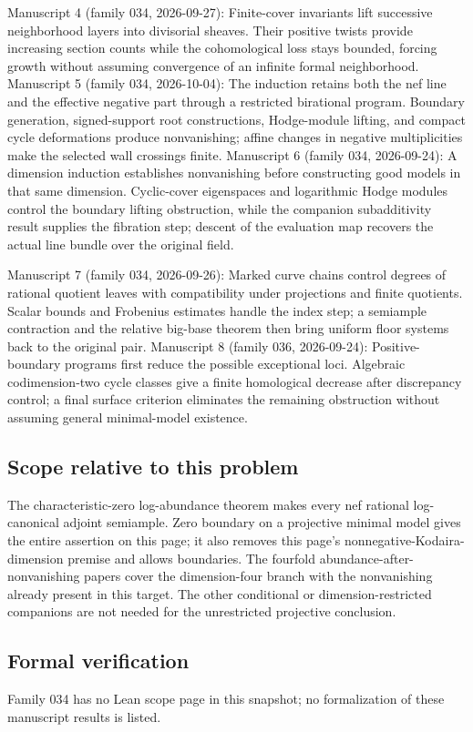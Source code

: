 \documentclass[11pt]{article}
\begin{document}
Manuscript 4 (family 034, 2026-09-27): Finite-cover invariants lift successive neighborhood layers into divisorial sheaves. Their positive twists provide increasing section counts while the cohomological loss stays bounded, forcing growth without assuming convergence of an infinite formal neighborhood. Manuscript 5 (family 034, 2026-10-04): The induction retains both the nef line and the effective negative part through a restricted birational program. Boundary generation, signed-support root constructions, Hodge-module lifting, and compact cycle deformations produce nonvanishing; affine changes in negative multiplicities make the selected wall crossings finite. Manuscript 6 (family 034, 2026-09-24): A dimension induction establishes nonvanishing before constructing good models in that same dimension. Cyclic-cover eigenspaces and logarithmic Hodge modules control the boundary lifting obstruction, while the companion subadditivity result supplies the fibration step; descent of the evaluation map recovers the actual line bundle over the original field.

Manuscript 7 (family 034, 2026-09-26): Marked curve chains control degrees of rational quotient leaves with compatibility under projections and finite quotients. Scalar bounds and Frobenius estimates handle the index step; a semiample contraction and the relative big-base theorem then bring uniform floor systems back to the original pair. Manuscript 8 (family 036, 2026-09-24): Positive-boundary programs first reduce the possible exceptional loci. Algebraic codimension-two cycle classes give a finite homological decrease after discrepancy control; a final surface criterion eliminates the remaining obstruction without assuming general minimal-model existence.

\subsection{Scope relative to this problem}
The characteristic-zero log-abundance theorem makes every nef rational log-canonical adjoint semiample. Zero boundary on a projective minimal model gives the entire assertion on this page; it also removes this page's nonnegative-Kodaira-dimension premise and allows boundaries. The fourfold abundance-after-nonvanishing papers cover the dimension-four branch with the nonvanishing already present in this target. The other conditional or dimension-restricted companions are not needed for the unrestricted projective conclusion.

\subsection{Formal verification}
Family 034 has no Lean scope page in this snapshot; no formalization of these manuscript results is listed.
\end{document}
